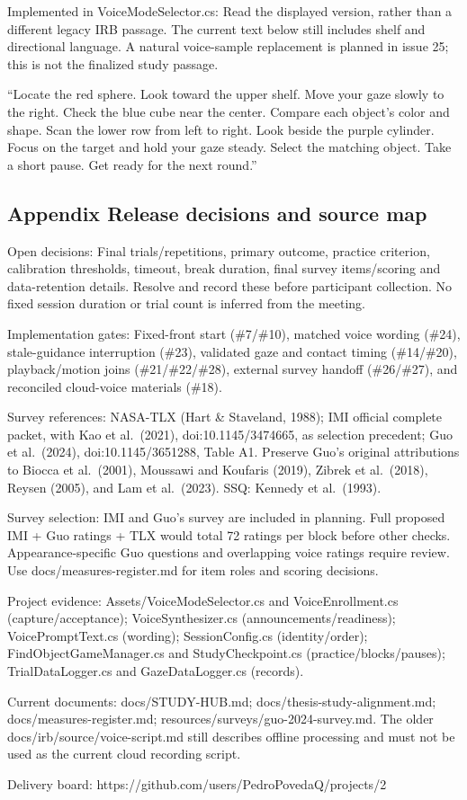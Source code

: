 Implemented in VoiceModeSelector.cs: Read the displayed version, rather
than a different legacy IRB passage. The current text below still
includes shelf and directional language. A natural voice-sample
replacement is planned in issue 25; this is not the finalized study
passage.

``Locate the red sphere. Look toward the upper shelf. Move your gaze
slowly to the right. Check the blue cube near the center. Compare each
object's color and shape. Scan the lower row from left to right. Look
beside the purple cylinder. Focus on the target and hold your gaze
steady. Select the matching object. Take a short pause. Get ready for
the next round.''

\subsection{Appendix Release decisions and source
map}\label{appendix-release-decisions-and-source-map}

Open decisions: Final trials/repetitions, primary outcome, practice
criterion, calibration thresholds, timeout, break duration, final survey
items/scoring and data-retention details. Resolve and record these
before participant collection. No fixed session duration or trial count
is inferred from the meeting.

Implementation gates: Fixed-front start (\#7/\#10), matched voice
wording (\#24), stale-guidance interruption (\#23), validated gaze and
contact timing (\#14/\#20), playback/motion joins (\#21/\#22/\#28),
external survey handoff (\#26/\#27), and reconciled cloud-voice
materials (\#18).

Survey references: NASA-TLX (Hart \& Staveland, 1988); IMI official
complete packet, with Kao et al.~(2021), doi:10.1145/3474665, as
selection precedent; Guo et al.~(2024), doi:10.1145/3651288, Table A1.
Preserve Guo's original attributions to Biocca et al.~(2001), Moussawi
and Koufaris (2019), Zibrek et al.~(2018), Reysen (2005), and Lam et
al.~(2023). SSQ: Kennedy et al.~(1993).

Survey selection: IMI and Guo's survey are included in planning. Full
proposed IMI + Guo ratings + TLX would total 72 ratings per block before
other checks. Appearance-specific Guo questions and overlapping voice
ratings require review. Use docs/measures-register.md for item roles and
scoring decisions.

Project evidence: Assets/VoiceModeSelector.cs and VoiceEnrollment.cs
(capture/acceptance); VoiceSynthesizer.cs (announcements/readiness);
VoicePromptText.cs (wording); SessionConfig.cs (identity/order);
FindObjectGameManager.cs and StudyCheckpoint.cs
(practice/blocks/pauses); TrialDataLogger.cs and GazeDataLogger.cs
(records).

Current documents: docs/STUDY-HUB.md; docs/thesis-study-alignment.md;
docs/measures-register.md; resources/surveys/guo-2024-survey.md. The
older docs/irb/source/voice-script.md still describes offline processing
and must not be used as the current cloud recording script.

Delivery board: https://github.com/users/PedroPovedaQ/projects/2
